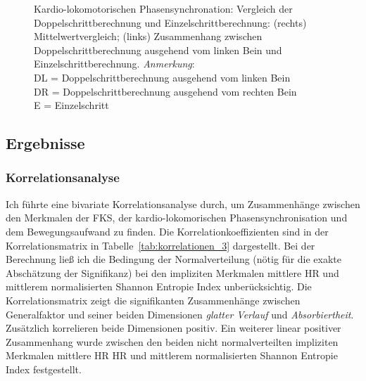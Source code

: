 \begin{figure}
	[!htb]  \caption[Kardio-lokomotorischen Phasensynchronation: Vergleich der Doppelschrittberechnung und Einzelschrittberechnung.]{Kardio-lokomotorischen Phasensynchronation: Vergleich der Doppelschrittberechnung und Einzelschrittberechnung: (rechts) Mittelwertvergleich; (links) Zusammenhang zwischen Doppelschrittberechnung ausgehend vom linken Bein und Einzelschrittberechnung. \emph{Anmerkung}: \\ \hspace{\textwidth}DL = Doppelschrittberechnung ausgehend vom linken Bein \\ \hspace{\textwidth}DR = Doppelschrittberechnung ausgehend vom rechten Bein \\ \hspace{\textwidth}E = Einzelschritt} \label{fig:index_vergleich} 
\end{figure}

\subsection{Ergebnisse} %
\label{sub:ergebnisse_5_3}

\subsubsection{Korrelationsanalyse} %
\label{ssub:korrelationsanalyse_5_3}

Ich führte eine bivariate Korrelationsanalyse durch, um Zusammenhänge zwischen den Merkmalen der \ac{FKS}, der kardio-lokomorischen Phasensynchronisation und dem Bewegungsaufwand zu finden. Die Korrelationkoeffizienten sind in der Korrelationsmatrix in Tabelle~\ref{tab:korrelationen_3} dargestellt. Bei der Berechnung ließ ich die Bedingung der Normalverteilung (nötig für die exakte Abschätzung der Signifikanz) bei den impliziten Merkmalen mittlere \ac{HR} und mittlerem normalisierten Shannon Entropie Index unberücksichtig. Die Korrelationsmatrix zeigt die signifikanten Zusammenhänge zwischen Generalfaktor und seiner beiden Dimensionen \emph{glatter Verlauf} und \emph{Absorbiertheit}. Zusätzlich korrelieren beide Dimensionen positiv. Ein weiterer linear positiver Zusammenhang wurde zwischen den beiden nicht normalverteilten impliziten Merkmalen mittlere HR \ac{HR} und mittlerem normalisierten Shannon Entropie Index festgestellt.

